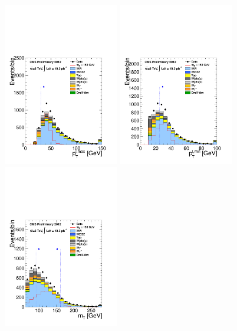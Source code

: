 \begin{figure}[htp]
\centering
\includegraphics[width=0.45\textwidth]{figures/hww_analysis16_160_ALL_of_0j_pt1.pdf}
\includegraphics[width=0.45\textwidth]{figures/hww_analysis16_160_ALL_of_0j_pt2.pdf}
\includegraphics[width=0.45\textwidth]{figures/hww_analysis16_160_ALL_of_0j_mt.pdf}

\end{figure}
